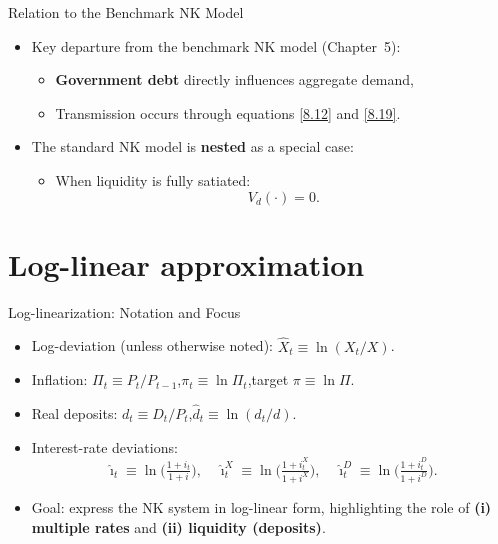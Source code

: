 \documentclass[11pt,aspectratio=169]{beamer}
\begin{document}
\begin{frame}{Relation to the Benchmark NK Model}
\begin{itemize}
  \item Key departure from the benchmark NK model (Chapter~5):
  \begin{itemize}
    \item \textbf{Government debt} directly influences aggregate demand,
    \item Transmission occurs through equations \eqref{8.12} and \eqref{8.19}.
  \end{itemize}
\vspace{0.4cm}
\item The standard NK model is \textbf{nested} as a special case:
  \begin{itemize}
    \item When liquidity is fully satiated:
    \[
      V_d(\cdot) = 0.
    \]
  \end{itemize}
\end{itemize}
\end{frame}


\section{Log-linear approximation}

\begin{frame}{Log-linearization: Notation and Focus}
\begin{itemize}
  \item Log-deviation (unless otherwise noted): $\hat X_t \equiv \ln(X_t/X)$.
  \item Inflation: $\Pi_t \equiv P_t/P_{t-1}$,\quad $\pi_t \equiv \ln \Pi_t$,\quad target $\pi \equiv \ln\Pi$.
  \item Real deposits: $d_t \equiv D_t/P_t$,\quad $\hat d_t \equiv \ln(d_t/d)$.
  \item Interest-rate deviations:
  \[
    \hat\imath_t \equiv \ln\!\Big(\tfrac{1+i_t}{1+i}\Big),\quad
    \hat\imath_t^X \equiv \ln\!\Big(\tfrac{1+i_t^X}{1+i^X}\Big),\quad
    \hat\imath_t^D \equiv \ln\!\Big(\tfrac{1+i_t^D}{1+i^D}\Big).
  \]
  \item Goal: express the NK system in log-linear form, highlighting the role of
  \textbf{(i) multiple rates} and \textbf{(ii) liquidity (deposits)}.
\end{itemize}
\end{frame}
\end{document}
